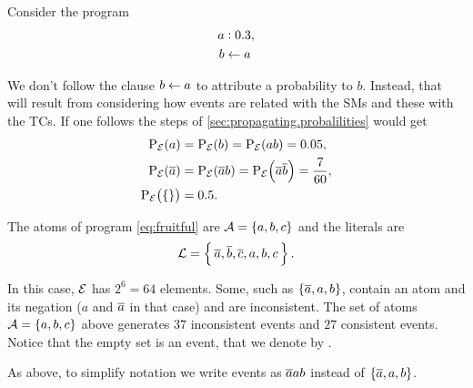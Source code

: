 \documentclass[x11names]{tlp}
\begin{document}
\ifExamples
	\begin{example}
		\label{example:not.syntax.propagation}
		\em

		Consider the program
		\begin{equation*}
			\begin{split}
				\probfact{a & }{0.3},   %
				\\
				b           & \clause a
			\end{split}
		\end{equation*}

		We don't follow the clause $b \leftarrow a$ to attribute a probability to $b$.
		Instead, that will result from considering how events are related with the
		\aclp{SM} and these with the \aclp{TC}. If one follows the steps of
		\cref{sec:propagating.probalilities} would get
		\begin{equation*}
			\begin{split}
				\prE\at{a}      & = \prE\at{b} = \prE\at{ab} = 0.05,                          %
				\\
				\prE\at{\co{a}} & = \prE\at{\co{a} b} = \prE\at{\co{a}\co{b}} = \frac{7}{60}, %
				\\
				\prE\at{\set{}} & = 0.5.                                                      %
				\\
			\end{split}
		\end{equation*}

	\end{example}
\fi

\ifExamples
	\begin{example}\label{ex:events}\em

		The atoms of program \cref{eq:fruitful} are $\ATOMSset = \set{a, b, c}$ and
		the literals are
		\begin{equation*}
			\LITERALSset = \set{\, \co{a}, \co{b}, \co{c}, a, b, c\, }.
		\end{equation*}

		In this case, $\EVENTSset$ has $2^6 = 64$ elements. Some, such as
		$\set{\ensuremath{\overline{a}}, a, b}$, contain an atom and its negation ($a$ and $\overline{a}$ in
		that case) and are inconsistent. The set of atoms $\ATOMSset = \set{a, b, c}$
		above generates $37$ inconsistent events and $27$ consistent events. Notice
		that the empty set is an event, that we denote by \emptyevent.

		As above, to simplify notation we write events as $\overline{a}ab$ instead of
		$\set{\ensuremath{\overline{a}}, a, b}$.
	\end{example}
\fi
\end{document}
